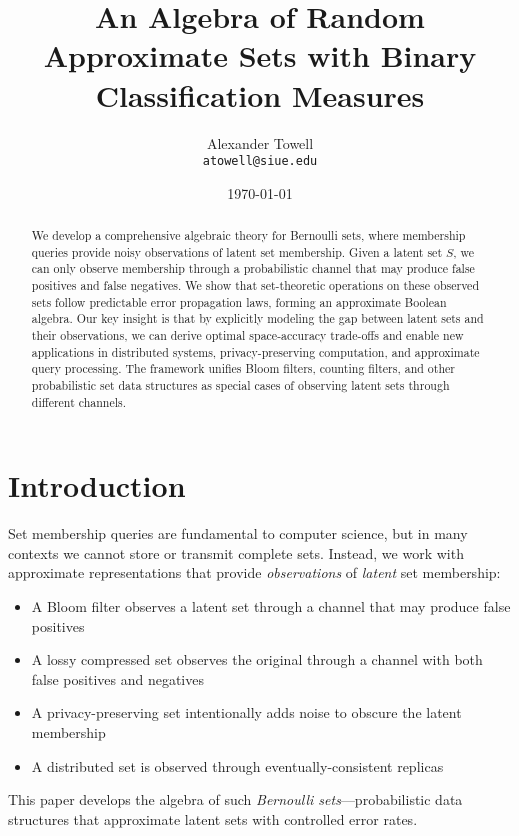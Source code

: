 \documentclass[11pt,final,hidelinks]{article}
\title{An Algebra of Random Approximate Sets with Binary Classification Measures}
\author{
    Alexander Towell\\
    \texttt{atowell@siue.edu}
}
\date{\today}
\begin{document}
\maketitle

\begin{abstract}
We develop a comprehensive algebraic theory for Bernoulli sets, where membership queries provide noisy observations of latent set membership. Given a latent set $S$, we can only observe membership through a probabilistic channel that may produce false positives and false negatives. We show that set-theoretic operations on these observed sets follow predictable error propagation laws, forming an approximate Boolean algebra. Our key insight is that by explicitly modeling the gap between latent sets and their observations, we can derive optimal space-accuracy trade-offs and enable new applications in distributed systems, privacy-preserving computation, and approximate query processing. The framework unifies Bloom filters, counting filters, and other probabilistic set data structures as special cases of observing latent sets through different channels.
\end{abstract}

\section{Introduction}

Set membership queries are fundamental to computer science, but in many contexts we cannot store or transmit complete sets. Instead, we work with approximate representations that provide \emph{observations} of \emph{latent} set membership:

\begin{itemize}
    \item A Bloom filter observes a latent set through a channel that may produce false positives
    \item A lossy compressed set observes the original through a channel with both false positives and negatives  
    \item A privacy-preserving set intentionally adds noise to obscure the latent membership
    \item A distributed set is observed through eventually-consistent replicas
\end{itemize}

This paper develops the algebra of such \emph{Bernoulli sets}—probabilistic data structures that approximate latent sets with controlled error rates.
\end{document}
